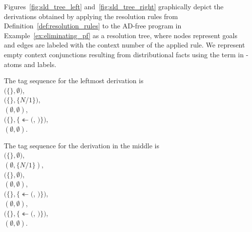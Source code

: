 \begin{example}
	\label{ex:resolution_tree}
	Figures~\ref{fig:sld_tree_left} and~\ref{fig:sld_tree_right} graphically depict the derivations obtained by applying the resolution rules from Definition~\ref{def:resolution_rules} to the AD-free program in Example~\ref{ex:eliminating_pf} as a resolution tree, where nodes represent goals and edges are labeled with the context number of the applied rule. We represent empty context conjunctions resulting from distributional facts using the term  in -atoms and labels. 
	
	The tag sequence for the leftmost derivation is\\
	$(\{$$\}, \emptyset)$, \\
	$(\{$$\}, \{N/1\})$,\\
	$(\emptyset, \emptyset)$,\\
	$(\{$$\}, \{$$\twoheadleftarrow ($, $)\})$,\\
	$(\emptyset, \emptyset)$.
	
	The tag sequence for the derivation in the middle is\\
	$(\{$$\}, \emptyset)$, \\
	$(\emptyset, \{N/1\})$,\\
	$(\{$$\}, \emptyset)$, \\
	$(\emptyset, \emptyset)$,\\
	$(\{$$\}, \{$$\twoheadleftarrow ($, $)\})$,\\
	$(\emptyset, \emptyset)$,\\
	$(\{$$\}, \{$$\twoheadleftarrow ($, $)\})$,\\
	$(\emptyset, \emptyset)$.
	

\end{example}
